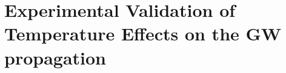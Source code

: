 \section{Experimental Validation of Temperature Effects on the GW propagation}
\label{sec:tempSetup}

